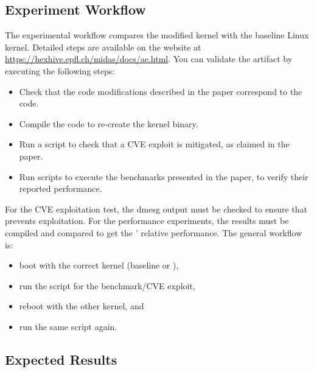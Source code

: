 \subsection{Experiment Workflow}

The experimental workflow compares the modified \midas{} kernel with
the baseline Linux kernel.
Detailed steps are available on the website at 
\url{https://hexhive.epfl.ch/midas/docs/ae.html}.
You can validate the artifact by executing the following steps:
\begin{itemize}[nosep]
  \item Check that the code modifications described in the paper correspond 
  to the code.
  \item Compile the code to re-create the kernel binary.
  \item Run a script to check that a CVE exploit is mitigated, as claimed 
  in the paper.
  \item Run scripts to execute the benchmarks presented in the paper, 
  to verify their reported performance.
\end{itemize}

For the CVE exploitation test, the dmesg output must be checked 
to ensure that \midas{} prevents exploitation.
For the performance experiments, the results must be compiled 
and compared to get the \midas{}' relative performance.
The general workflow is:
\begin{itemize}[nosep]
  \item boot with the correct kernel (baseline or \midas{}),
  \item run the script for the benchmark/CVE exploit,
  \item reboot with the other kernel, and 
  \item run the same script again.
\end{itemize}

\balance
\subsection{Expected Results}


